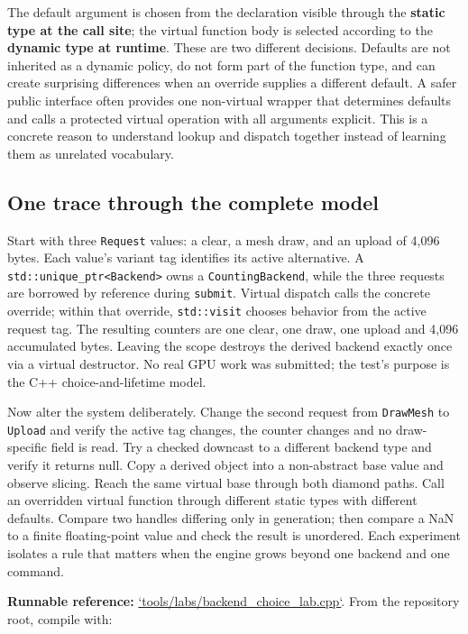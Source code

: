 The default argument is chosen from the declaration visible through the \textbf{static type at the call site}; the virtual function body is selected according to the \textbf{dynamic type at runtime}. These are two different decisions. Defaults are not inherited as a dynamic policy, do not form part of the function type, and can create surprising differences when an override supplies a different default. A safer public interface often provides one non-virtual wrapper that determines defaults and calls a protected virtual operation with all arguments explicit. This is a concrete reason to understand lookup and dispatch together instead of learning them as unrelated vocabulary.

\subsection{One trace through the complete model}\label{01-foundations-i-ch004-one-trace-through-the-complete-model}

Start with three \texttt{Request} values: a clear, a mesh draw, and an upload of 4,096 bytes. Each value's variant tag identifies its active alternative. A \texttt{std::unique\_ptr\textless{}Backend\textgreater{}} owns a \texttt{CountingBackend}, while the three requests are borrowed by reference during \texttt{submit}. Virtual dispatch calls the concrete override; within that override, \texttt{std::visit} chooses behavior from the active request tag. The resulting counters are one clear, one draw, one upload and 4,096 accumulated bytes. Leaving the scope destroys the derived backend exactly once via a virtual destructor. No real GPU work was submitted; the test's purpose is the C++ choice-and-lifetime model.

Now alter the system deliberately. Change the second request from \texttt{DrawMesh} to \texttt{Upload} and verify the active tag changes, the counter changes and no draw-specific field is read. Try a checked downcast to a different backend type and verify it returns null. Copy a derived object into a non-abstract base value and observe slicing. Reach the same virtual base through both diamond paths. Call an overridden virtual function through different static types with different defaults. Compare two handles differing only in generation; then compare a NaN to a finite floating-point value and check the result is unordered. Each experiment isolates a rule that matters when the engine grows beyond one backend and one command.

\textbf{Runnable reference:} \hyperref[source-file-9e5ff4ba88e6efabc938832a]{`tools/labs/backend\_choice\_lab.cpp`}. From the repository root, compile with:

